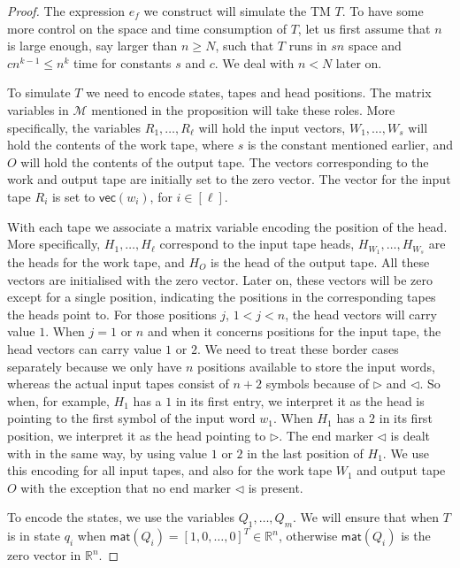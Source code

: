 \begin{proof}
	The expression $e_f$ we construct will simulate the TM $T$. To have some more control on the space 
	and time consumption of $T$, let us first assume that $n$ is large enough, say larger than $n\geq N$, 
	such that $T$ runs in $sn$ space and $cn^{k-1}\leq n^k$ time for constants $s$ and $c$. We deal with $n<N$ later on.

    To simulate $T$ we need to encode states, tapes and head positions. The matrix variables in 
    $\mathcal{M}$ mentioned in the proposition will take these roles. More specifically, the variables 
    $R_1,\ldots,R_\ell$ will hold the input vectors, $W_1,\ldots,W_s$ will hold the contents of the work
    tape, where $s$ is the constant mentioned earlier, and $O$ will hold the contents of the output tape. 
    The vectors corresponding to the work and output tape are initially set to the zero vector. 
    The vector for the input tape $R_i$ is set to $\mathsf{vec}(w_i)$, for $i\in[\ell]$.

    With each tape we associate a matrix variable encoding the position of the head. More specifically, 
    $H_1,\ldots,H_\ell$ correspond to the input tape heads,
    $H_{W_1},\ldots, H_{W_s}$ are the heads for the work tape, and $H_O$ is the head of the output tape. 
    All these vectors are initialised with the zero vector. Later on, these vectors will be zero except 
    for a single position, indicating the positions in the corresponding tapes the heads point to. 
    For those positions $j$, $1<j<n$, the head vectors will carry value $1$.  When $j=1$ or $n$ and when 
    it concerns positions for the input tape, the head vectors can carry value $1$ or $2$. We need to treat 
    these border cases separately
    because we only have $n$ positions available to store the input words, whereas the actual input tapes 
    consist of $n+2$ symbols because of $\rhd$ and $\lhd$. So when, for example, $H_1$ has a $1$ in its first
    entry, we interpret it as the head is pointing to the first symbol of the input word $w_1$. When $H_1$
    has a $2$ in its first position, we interpret it as the head pointing to $\rhd$. The end marker $\lhd$ is
    dealt with in the same way, by using value $1$ or $2$ in the last position of $H_1$. We use this encoding
    for all input tapes, and also for the work tape $W_1$ and output tape $O$ with the exception that no end 
    marker $\lhd$ is present.


    To encode the states, we use the variables $Q_1,\ldots,Q_m$. We will ensure that when $T$ is in state 
    $q_i$ when
    $\mathsf{mat}(Q_i)=[1,0,\ldots,0]^T\in\mathbb{R}^n$, otherwise $\mathsf{mat}(Q_i)$ is the zero 
    vector in $\mathbb{R}^n$.	


\end{proof}
